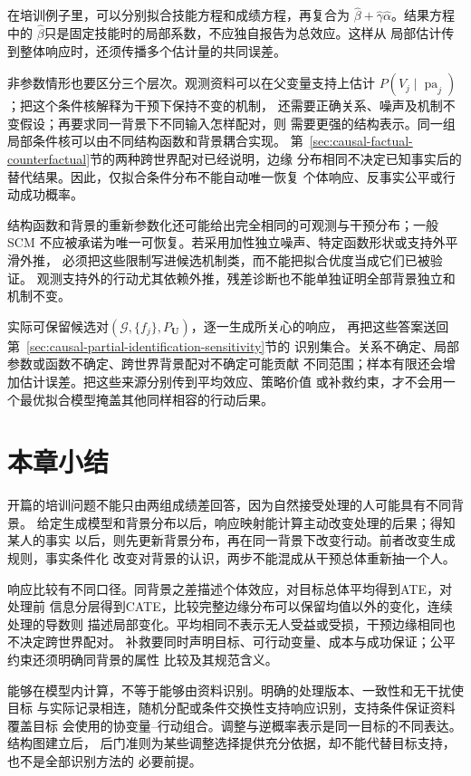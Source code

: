 在培训例子里，可以分别拟合技能方程和成绩方程，再复合为
\(\widehat\beta+\widehat\gamma\widehat\alpha\)。结果方程中的
\(\widehat\beta\)只是固定技能时的局部系数，不应独自报告为总效应。这样从
局部估计传到整体响应时，还须传播多个估计量的共同误差。

非参数情形也要区分三个层次。观测资料可以在父变量支持上估计
\(P(V_j\mid\operatorname{pa}_j)\)；把这个条件核解释为干预下保持不变的机制，
还需要正确关系、噪声及机制不变假设；再要求同一背景下不同输入怎样配对，则
需要更强的结构表示。同一组局部条件核可以由不同结构函数和背景耦合实现。
第~\ref{sec:causal-factual-counterfactual}节的两种跨世界配对已经说明，边缘
分布相同不决定已知事实后的替代结果。因此，仅拟合条件分布不能自动唯一恢复
个体响应、反事实公平或行动成功概率。

结构函数和背景的重新参数化还可能给出完全相同的可观测与干预分布；一般SCM
不应被承诺为唯一可恢复。若采用加性独立噪声、特定函数形状或支持外平滑外推，
必须把这些限制写进候选机制类，而不能把拟合优度当成它们已被验证。
观测支持外的行动尤其依赖外推，残差诊断也不能单独证明全部背景独立和机制不变。

实际可保留候选对\((\mathcal G,\{f_j\},P_{\bm U})\)，逐一生成所关心的响应，
再把这些答案送回第~\ref{sec:causal-partial-identification-sensitivity}节的
识别集合。关系不确定、局部参数或函数不确定、跨世界背景配对不确定可能贡献
不同范围；样本有限还会增加估计误差。把这些来源分别传到平均效应、策略价值
或补救约束，才不会用一个最优拟合模型掩盖其他同样相容的行动后果。

\section{本章小结}
\label{sec:causal-inference-summary}

开篇的培训问题不能只由两组成绩差回答，因为自然接受处理的人可能具有不同背景。
给定生成模型和背景分布以后，响应映射能计算主动改变处理的后果；得知某人的事实
以后，则先更新背景分布，再在同一背景下改变行动。前者改变生成规则，事实条件化
改变对背景的认识，两步不能混成从干预总体重新抽一个人。

响应比较有不同口径。同背景之差描述个体效应，对目标总体平均得到ATE，对处理前
信息分层得到CATE，比较完整边缘分布可以保留均值以外的变化，连续处理的导数则
描述局部变化。平均相同不表示无人受益或受损，干预边缘相同也不决定跨世界配对。
补救要同时声明目标、可行动变量、成本与成功保证；公平约束还须明确同背景的属性
比较及其规范含义。

能够在模型内计算，不等于能够由资料识别。明确的处理版本、一致性和无干扰使目标
与实际记录相连，随机分配或条件交换性支持响应识别，支持条件保证资料覆盖目标
会使用的协变量--行动组合。调整与逆概率表示是同一目标的不同表达。结构图建立后，
后门准则为某些调整选择提供充分依据，却不能代替目标支持，也不是全部识别方法的
必要前提。

